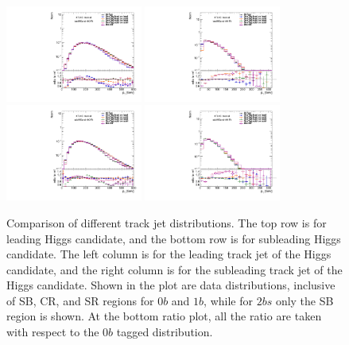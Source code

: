 \begin{figure}[htbp!]
\begin{center}
\includegraphics[width=0.4\textwidth,angle=-90]{figures/boosted/Prereweight/2bs_directcompare_leadHCand_trk0_Pt_1.pdf}
\includegraphics[width=0.4\textwidth,angle=-90]{figures/boosted/Prereweight/2bs_directcompare_leadHCand_trk1_Pt_1.pdf}\\
\includegraphics[width=0.4\textwidth,angle=-90]{figures/boosted/Prereweight/2bs_directcompare_sublHCand_trk0_Pt_1.pdf}
\includegraphics[width=0.4\textwidth,angle=-90]{figures/boosted/Prereweight/2bs_directcompare_sublHCand_trk1_Pt_1.pdf}\\
\caption{Comparison of different track jet \pt distributions. 
The top row is for leading Higgs candidate, and the bottom row is for subleading Higgs candidate. 
The left column is for the leading track jet of the Higgs candidate, and the right column is for the subleading track jet of the Higgs candidate. 
Shown in the plot are data distributions, inclusive of SB, CR, and SR regions for 0$b$ and $1b$, while for $2bs$ only the SB region is shown. At the bottom ratio plot, all the ratio are taken with respect to the 0$b$ tagged distribution.}
\label{fig:rw-2bs-comp}
\end{center}
\end{figure}

